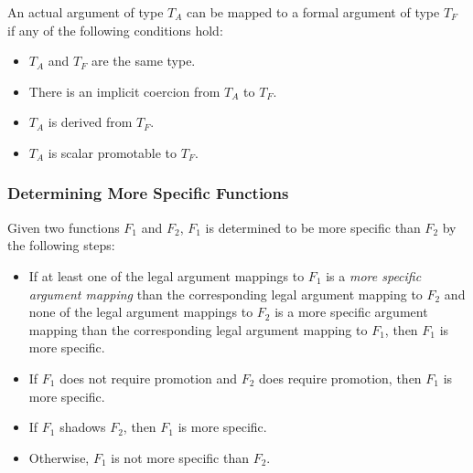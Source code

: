 An actual argument of type $T_A$ can be mapped to a formal argument of
type $T_F$ if any of the following conditions hold:
\begin{itemize}
\item $T_A$ and $T_F$ are the same type.
\item There is an implicit coercion from $T_A$ to $T_F$.
\item $T_A$ is derived from $T_F$.
\item $T_A$ is scalar promotable to $T_F$.
\end{itemize}

\subsubsection{Determining More Specific Functions}
\label{Determining_More_Specific_Functions}

Given two functions $F_1$ and $F_2$, $F_1$ is determined to be more
specific than $F_2$ by the following steps:
\begin{itemize}
\item
If at least one of the legal argument mappings to $F_1$ is a {\em more
specific argument mapping} than the corresponding legal argument
mapping to $F_2$ and none of the legal argument mappings to $F_2$ is a
more specific argument mapping than the corresponding legal argument
mapping to $F_1$, then $F_1$ is more specific.
\item If $F_1$ does not require promotion and $F_2$ does require promotion, then $F_1$ is more specific.
\item If $F_1$ shadows $F_2$, then $F_1$ is more specific.
\item Otherwise, $F_1$ is not more specific than $F_2$.
\end{itemize}

